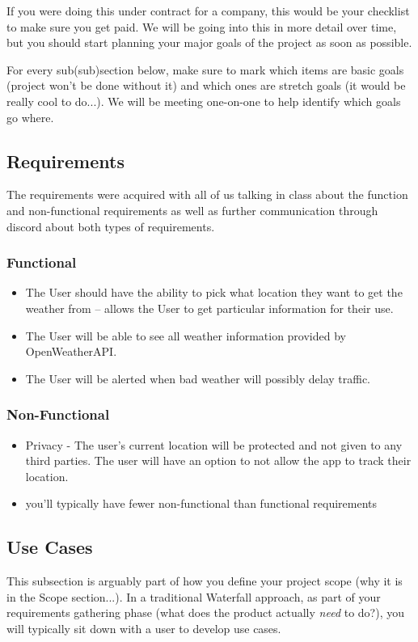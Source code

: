 \documentclass[10pt,conference,onecolumn,compsoc]{IEEEtran}
\begin{document}
If you were doing this under contract for a company, this would be your checklist to make sure you get paid.  We will be going into this in more detail over time, but you should start planning your major goals of the project as soon as possible.

For every sub(sub)section below, make sure to mark which items are basic goals (project won't be done without it) and which ones are stretch goals (it would be really cool to do...).  We will be meeting one-on-one to help identify which goals go where.

\subsection{Requirements}
The requirements were acquired with all of us talking in class about the function and non-functional requirements as well as further communication through discord about both types of requirements.

\subsubsection{Functional}
\begin{itemize}
\item The User should have the ability to pick what location they want to get the weather from -- allows the User to get particular information for their use.
\item The User will be able to see all weather information provided by OpenWeatherAPI.
\item The User will be alerted when bad weather will possibly delay traffic. 
\end{itemize}

\subsubsection{Non-Functional}
\begin{itemize}
\item Privacy - The user's current location will be protected and not given to any third parties. The user will have an option to not allow the app to track their location.
\item you'll typically have fewer non-functional than functional requirements
\end{itemize}

\subsection{Use Cases}
This subsection is arguably part of how you define your project scope (why it is in the Scope section...).  In a traditional Waterfall approach, as part of your requirements gathering phase (what does the product actually \emph{need} to do?), you will typically sit down with a user to develop use cases.
\end{document}
